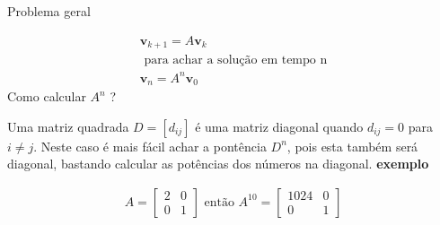 \documentclass{beamer}
\begin{document}
\begin{frame}{Problema geral}

  \begin{gather*}
    \mathbf{v}_{k+1} = A \mathbf{v}_k \\
    \text{ para achar a solução em tempo n} \\
    \mathbf{v}_n = A^n \mathbf{v}_0
\end{gather*}
Como calcular $A^n$ ?
  
\end{frame} 

\begin{frame}
  Uma matriz quadrada $D =[d_{ij}]$ é uma matriz diagonal 
  quando $d_{ij}=0$ para $i\neq j.$ Neste caso é mais 
  fácil achar a pontência $D^n$, pois esta também será
  diagonal, bastando calcular as potências dos números 
  na diagonal.
  \textbf{exemplo}
  
  \begin{gather*}
    A = \begin{bmatrix}
      2 & 0 \\ 0 & 1
    \end{bmatrix} \text{ então } A^{10} = \begin{bmatrix}
      1024 & 0 \\ 0 & 1
    \end{bmatrix}
  \end{gather*}
\end{frame}
\end{document}
